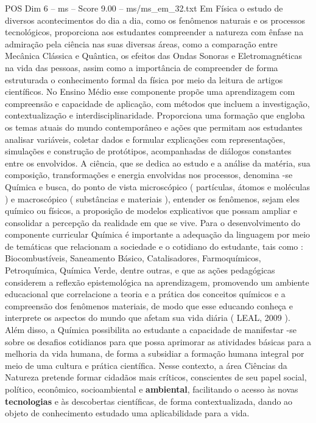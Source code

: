\begin{textsample}{POS Dim 6 – ms – Score 9.00 – ms/ms\_em\_32.txt}
Em Física o estudo de diversos acontecimentos do dia a dia, como os fenômenos naturais e os processos tecnológicos, proporciona aos estudantes compreender a natureza com ênfase na admiração pela ciência nas suas diversas áreas, como a comparação entre Mecânica Clássica e Quântica, os efeitos das Ondas Sonoras e Eletromagnéticas na vida das pessoas, assim como a importância de compreender de forma estruturada o conhecimento formal da física por meio da leitura de artigos científicos.
No Ensino Médio esse componente propõe uma aprendizagem com compreensão e capacidade de aplicação, com métodos que incluem a investigação, contextualização e interdisciplinaridade.
Proporciona uma formação que engloba os temas atuais do mundo contemporâneo e ações que permitam aos estudantes analisar variáveis, coletar dados e formular explicações com representações, simulações e construção de protótipos, acompanhadas de diálogos constantes entre os envolvidos.
A ciência, que se dedica ao estudo e a análise da matéria, sua composição, transformações e energia envolvidas nos processos, denomina -se Química e busca, do ponto de vista microscópico ( partículas, átomos e moléculas ) e macroscópico ( substâncias e materiais ), entender os fenômenos, sejam eles químico ou físicos, a proposição de modelos explicativos que possam ampliar e consolidar a percepção da realidade em que se vive.
Para o desenvolvimento do componente curricular Química é importante a adequação da linguagem por meio de temáticas que relacionam a sociedade e o cotidiano do estudante, tais como : Biocombustíveis, Saneamento Básico, Catalisadores, Farmoquímicos, Petroquímica, Química Verde, dentre outras, e que as ações pedagógicas considerem a reflexão epistemológica na aprendizagem, promovendo um ambiente educacional que correlacione a teoria e a prática dos conceitos químicos e a compreensão dos fenômenos materiais, de modo que esse educando conheça e interprete os aspectos do mundo que afetam sua vida diária ( LEAL, 2009 ).
Além disso, a Química possibilita ao estudante a capacidade de manifestar -se sobre os desafios cotidianos para que possa aprimorar as atividades básicas para a melhoria da vida humana, de forma a subsidiar a formação humana integral por meio de uma cultura e prática científica.
Nesse contexto, a área Ciências da Natureza pretende formar cidadãos mais críticos, conscientes de seu papel social, político, econômico, socioambiental e \textbf{ambiental}, facilitando o acesso às novas \textbf{tecnologias} e às descobertas científicas, de forma contextualizada, dando ao objeto de conhecimento estudado uma aplicabilidade para a vida.

\end{textsample}
